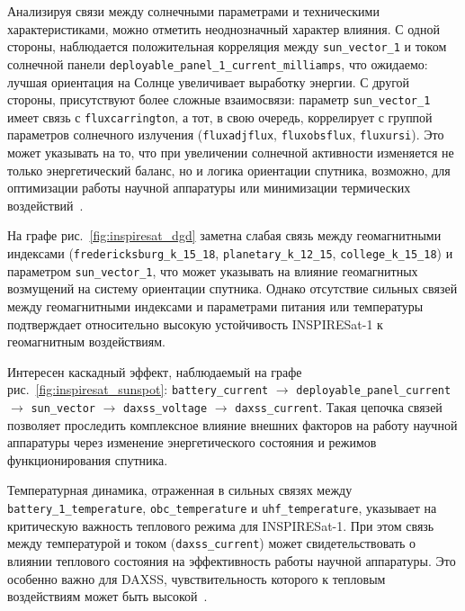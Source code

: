 Анализируя связи между солнечными параметрами и техническими характеристиками,
можно отметить неоднозначный характер влияния. С одной стороны, наблюдается
положительная корреляция между \texttt{sun\_vector\_1} и током солнечной панели
\texttt{deployable\_panel\_1\_current\_milliamps}, что ожидаемо: лучшая
ориентация на Солнце увеличивает выработку энергии. С другой стороны,
присутствуют более сложные взаимосвязи: параметр \texttt{sun\_vector\_1} имеет
связь с \texttt{fluxcarrington}, а тот, в свою очередь, коррелирует с группой
параметров солнечного излучения (\texttt{fluxadjflux}, \texttt{fluxobsflux},
\texttt{fluxursi}). Это может указывать на то, что при увеличении солнечной
активности изменяется не только энергетический баланс, но и логика ориентации
спутника, возможно, для оптимизации работы научной аппаратуры или минимизации
термических воздействий~\cite{nanosats_inspiresat}.

На графе рис.~\ref{fig:inspiresat_dgd}
заметна
слабая связь между геомагнитными индексами (\texttt{fredericksburg\_k\_15\_18},
\texttt{planetary\_k\_12\_15}, \texttt{college\_k\_15\_18}) и параметром
\texttt{sun\_vector\_1}, что может указывать на влияние геомагнитных возмущений
на систему ориентации спутника. Однако отсутствие сильных связей между
геомагнитными индексами и параметрами питания или температуры подтверждает
относительно высокую устойчивость INSPIRESat-1 к геомагнитным воздействиям.

Интересен каскадный эффект, наблюдаемый на графе
рис.~\ref{fig:inspiresat_sunspot}:
\texttt{battery\_current} $\rightarrow$
\texttt{deployable\_panel\_current} $\rightarrow$
\texttt{sun\_vector} $\rightarrow$
\texttt{daxss\_voltage} $\rightarrow$ \texttt{daxss\_current}.
Такая цепочка связей позволяет проследить комплексное влияние внешних факторов
на работу научной аппаратуры через изменение энергетического состояния и режимов
функционирования спутника.

Температурная динамика, отраженная в сильных связях между
\texttt{battery\_1\_temperature}, \texttt{obc\_temperature} и
\texttt{uhf\_temperature}, указывает на критическую важность теплового
режима для INSPIRESat-1. При этом связь между температурой и током
(\texttt{daxss\_current}) может свидетельствовать о влиянии теплового
состояния на эффективность работы научной аппаратуры. Это особенно важно для
DAXSS, чувствительность которого к тепловым воздействиям может быть
высокой~\cite{eoportal_inspiresat}.


